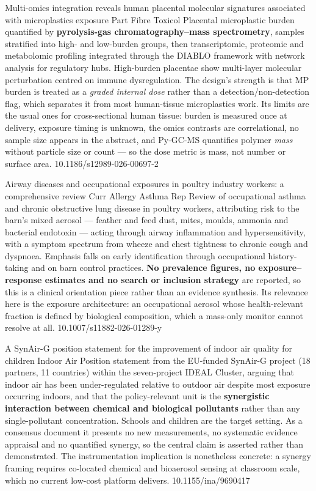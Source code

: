 \documentclass[10pt]{article}
\begin{document}
{Multi-omics integration reveals human placental molecular signatures associated with
microplastics exposure}
{Part Fibre Toxicol}
{Placental microplastic burden quantified by \textbf{pyrolysis-gas chromatography--mass
spectrometry}, samples stratified into high- and low-burden groups, then transcriptomic,
proteomic and metabolomic profiling integrated through the DIABLO framework with network
analysis for regulatory hubs. High-burden placentae show multi-layer molecular
perturbation centred on immune dysregulation. The design's strength is that MP burden is
treated as a \emph{graded internal dose} rather than a detection/non-detection flag,
which separates it from most human-tissue microplastics work. Its limits are the usual
ones for cross-sectional human tissue: burden is measured once at delivery, exposure
timing is unknown, the omics contrasts are correlational, no sample size appears in the
abstract, and Py-GC-MS quantifies polymer \emph{mass} without particle size or count ---
so the dose metric is mass, not number or surface area.}
{10.1186/s12989-026-00697-2}

\clearpage


{Airway diseases and occupational exposures in poultry industry workers: a comprehensive
review}
{Curr Allergy Asthma Rep}
{Review of occupational asthma and chronic obstructive lung disease in poultry workers,
attributing risk to the barn's mixed aerosol --- feather and feed dust, mites, moulds,
ammonia and bacterial endotoxin --- acting through airway inflammation and
hypersensitivity, with a symptom spectrum from wheeze and chest tightness to chronic
cough and dyspnoea. Emphasis falls on early identification through occupational
history-taking and on barn control practices. \textbf{No prevalence figures, no
exposure--response estimates and no search or inclusion strategy} are reported, so this is
a clinical orientation piece rather than an evidence synthesis. Its relevance here is the
exposure architecture: an occupational aerosol whose health-relevant fraction is defined
by biological composition, which a mass-only monitor cannot resolve at all.}
{10.1007/s11882-026-01289-y}

{A SynAir-G position statement for the improvement of indoor air quality for children}
{Indoor Air}
{Position statement from the EU-funded SynAir-G project (18 partners, 11 countries) within
the seven-project IDEAL Cluster, arguing that indoor air has been under-regulated relative
to outdoor air despite most exposure occurring indoors, and that the policy-relevant unit
is the \textbf{synergistic interaction between chemical and biological pollutants} rather
than any single-pollutant concentration. Schools and children are the target setting. As a
consensus document it presents no new measurements, no systematic evidence appraisal and
no quantified synergy, so the central claim is asserted rather than demonstrated. The
instrumentation implication is nonetheless concrete: a synergy framing requires co-located
chemical and bioaerosol sensing at classroom scale, which no current low-cost platform
delivers.}
{10.1155/ina/9690417}
\end{document}
